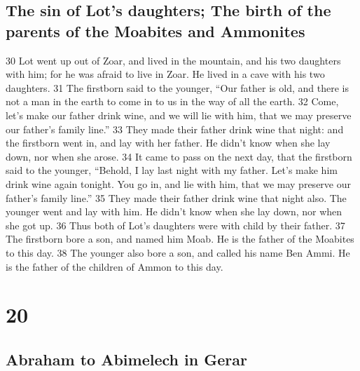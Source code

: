\hypertarget{the-sin-of-lots-daughters-the-birth-of-the-parents-of-the-moabites-and-ammonites}{%
\subsection{The sin of Lot's daughters; The birth of the parents of the
Moabites and
Ammonites}\label{the-sin-of-lots-daughters-the-birth-of-the-parents-of-the-moabites-and-ammonites}}

{30} Lot went up out of Zoar, and lived in the mountain, and his two
daughters with him; for he was afraid to live in Zoar. He lived in a
cave with his two daughters. {31} The firstborn said to the younger,
``Our father is old, and there is not a man in the earth to come in to
us in the way of all the earth. {32} Come, let's make our father drink
wine, and we will lie with him, that we may preserve our father's family
line.'' {33} They made their father drink wine that night: and the
firstborn went in, and lay with her father. He didn't know when she lay
down, nor when she arose. {34} It came to pass on the next day, that the
firstborn said to the younger, ``Behold, I lay last night with my
father. Let's make him drink wine again tonight. You go in, and lie with
him, that we may preserve our father's family line.'' {35} They made
their father drink wine that night also. The younger went and lay with
him. He didn't know when she lay down, nor when she got up. {36} Thus
both of Lot's daughters were with child by their father. {37} The
firstborn bore a son, and named him Moab. He is the father of the
Moabites to this day. {38} The younger also bore a son, and called his
name Ben Ammi. He is the father of the children of Ammon to this day.

\hypertarget{section-19}{%
\section{20}\label{section-19}}

\hypertarget{abraham-to-abimelech-in-gerar}{%
\subsection{Abraham to Abimelech in
Gerar}\label{abraham-to-abimelech-in-gerar}}

